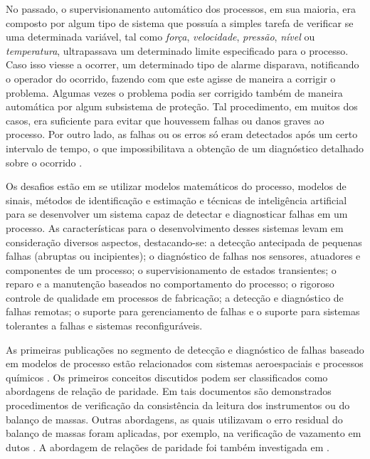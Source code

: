 No passado, o supervisionamento automático dos processos, em sua maioria, era
composto por algum tipo de sistema que possuía a simples tarefa de verificar se
uma determinada variável, tal como {\it força}, {\it velocidade}, {\it pressão},
{\it nível} ou {\it temperatura}, ultrapassava um determinado limite
especificado para o processo. Caso isso viesse a ocorrer, um determinado tipo de
alarme disparava, notificando o operador do ocorrido, fazendo com que este
agisse de maneira a corrigir o problema. Algumas vezes o problema podia ser
corrigido também de maneira automática por algum subsistema de proteção. Tal
procedimento, em muitos dos casos, era suficiente para evitar que houvessem
falhas ou danos graves ao processo. Por outro lado, as falhas ou os erros só
eram detectados após um certo intervalo de tempo, o que impossibilitava a
obtenção de um diagnóstico detalhado sobre o ocorrido \cite{isermann:2005}.

Os desafios estão em se utilizar modelos matemáticos do processo, modelos de
sinais, métodos de identificação e estimação e técnicas de inteligência
artificial para se desenvolver um sistema capaz de detectar e diagnosticar
falhas em um processo. As características para o desenvolvimento desses sistemas
levam em consideração diversos aspectos, destacando-se: a detecção antecipada de
pequenas falhas (abruptas ou incipientes); o diagnóstico de falhas nos sensores,
atuadores e componentes de um processo; o supervisionamento de estados
transientes; o reparo e a manutenção baseados no comportamento do processo; o
rigoroso controle de qualidade em processos de fabricação; a detecção e
diagnóstico de falhas remotas; o suporte para gerenciamento de falhas e o
suporte para sistemas tolerantes a falhas e sistemas reconfiguráveis.

As primeiras publicações no segmento de detecção e diagnóstico de falhas baseado
em modelos de processo estão relacionados com sistemas aeroespaciais
\cite{beard:1971,jones:1973,willsky:1976,clark:1978} e processos químicos
\cite{himmelblau:1978}. Os primeiros conceitos discutidos podem ser
classificados como abordagens de relação de paridade. Em tais documentos são
demonstrados procedimentos de verificação da consistência da leitura dos
instrumentos ou do balanço de massas. Outras abordagens, as quais utilizavam o
erro residual do balanço de massas foram aplicadas, por exemplo, na verificação
de vazamento em dutos \cite{billman:1987}. A abordagem de relações de paridade
foi também investigada em .

